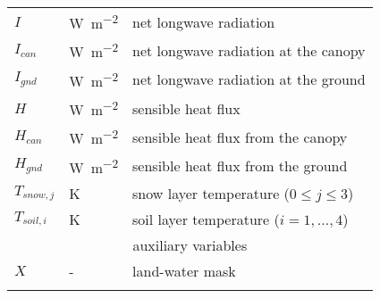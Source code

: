 \begin{table}[t]
\begin{tabular}{lll}
        $I$          & \unit{W~m^{-2}}         & net longwave radiation                     \\
        $I_{can}$    & \unit{W~m^{-2}}         & net longwave radiation at the canopy       \\
        $I_{gnd}$    & \unit{W~m^{-2}}         & net longwave radiation at the ground       \\
        $H$          & \unit{W~m^{-2}}         & sensible heat flux                         \\
        $H_{can}$    & \unit{W~m^{-2}}         & sensible heat flux from the canopy         \\
        $H_{gnd}$    & \unit{W~m^{-2}}         & sensible heat flux from the ground         \\
        $T_{snow,j}$ & \unit{K}                & snow layer temperature ($0 \leq j \leq 3$) \\
        $T_{soil,i}$ & \unit{K}                & soil layer temperature ($i=1,\dots,4$)     \\
        [1pt]
        \multicolumn{3}{c}{auxiliary variables}                                             \\
        $X$          & \unit{-}                & land-water mask                            \\
        \bottomhline
    \end{tabular}
\end{table}
